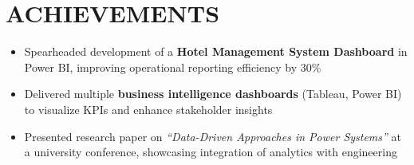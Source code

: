 \documentclass[11pt,a4paper]{article}
\newcommand{\resumeItem}[1]{\item\small{#1}}
\begin{document}
\section{ACHIEVEMENTS}
\begin{itemize}[leftmargin=0.15in, label={}]
  \resumeItem{Spearheaded development of a \textbf{Hotel Management System Dashboard} in Power BI, improving operational reporting efficiency by 30\%}
  \resumeItem{Delivered multiple \textbf{business intelligence dashboards} (Tableau, Power BI) to visualize KPIs and enhance stakeholder insights}
  \resumeItem{Presented research paper on \textit{``Data-Driven Approaches in Power Systems''} at a university conference, showcasing integration of analytics with engineering}
\end{itemize}
\end{document}
